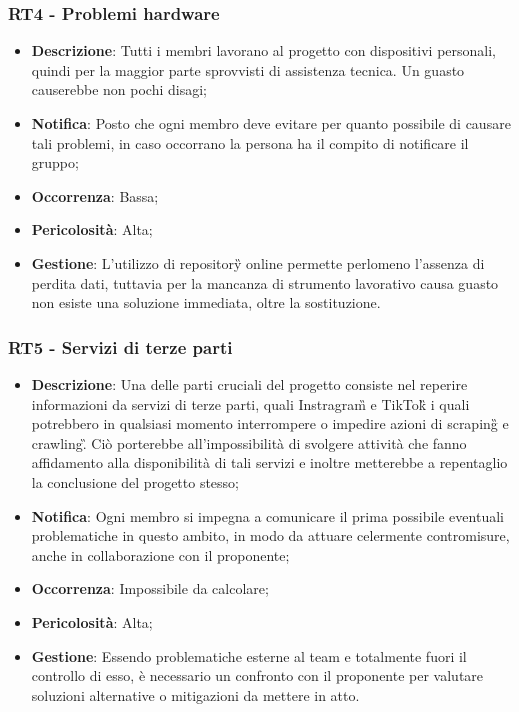 	\subsubsection*{RT4 - Problemi hardware}
	\begin{itemize}
		\item \textbf{Descrizione}: Tutti i membri lavorano al progetto con dispositivi personali, quindi per la maggior parte sprovvisti di assistenza tecnica. Un guasto causerebbe non pochi disagi;
		\item \textbf{Notifica}: Posto che ogni membro deve evitare per quanto possibile di causare tali problemi, in caso occorrano la persona ha il compito di notificare il gruppo;
		\item \textbf{Occorrenza}: Bassa;
		\item \textbf{Pericolosità}: Alta;
		\item \textbf{Gestione}: L'utilizzo di repository\G{} online permette perlomeno l'assenza di perdita dati, tuttavia per la mancanza di strumento lavorativo causa guasto non esiste una soluzione immediata, oltre la sostituzione.
	\end{itemize}

	\subsubsection*{RT5 - Servizi di terze parti}
	\begin{itemize}
		\item \textbf{Descrizione}: Una delle parti cruciali del progetto consiste nel reperire informazioni da servizi di terze parti, quali Instragram\G{} e TikTok\G{} i quali potrebbero in qualsiasi momento interrompere o impedire azioni di scraping\G{} e crawling\G. Ciò porterebbe all'impossibilità di svolgere attività che fanno affidamento alla disponibilità di tali servizi e inoltre metterebbe a repentaglio la conclusione del progetto stesso;
		\item \textbf{Notifica}: Ogni membro si impegna a comunicare il prima possibile eventuali problematiche in questo ambito, in modo da attuare celermente contromisure, anche in collaborazione con il proponente;
		\item \textbf{Occorrenza}: Impossibile da calcolare;
		\item \textbf{Pericolosità}: Alta;
		\item \textbf{Gestione}: Essendo problematiche esterne al team e totalmente fuori il controllo di esso, è necessario un confronto con il proponente per valutare soluzioni alternative o mitigazioni da mettere in atto.
	\end{itemize}

